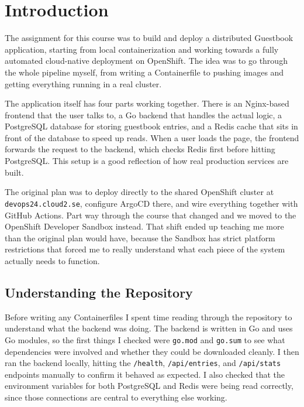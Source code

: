 \section{Introduction}

The assignment for this course was to build and deploy a distributed Guestbook application,
starting from local containerization and working towards a fully automated cloud-native
deployment on OpenShift. The idea was to go through the whole pipeline myself, from writing
a Containerfile to pushing images and getting everything running in a real cluster.

The application itself has four parts working together. There is an Nginx-based frontend
that the user talks to, a Go backend that handles the actual logic, a PostgreSQL database
for storing guestbook entries, and a Redis cache that sits in front of the database to
speed up reads. When a user loads the page, the frontend forwards the request to the
backend, which checks Redis first before hitting PostgreSQL. This setup is a good
reflection of how real production services are built.

The original plan was to deploy directly to the shared OpenShift cluster at
\texttt{devops24.cloud2.se}, configure ArgoCD there, and wire everything together with
GitHub Actions. Part way through the course that changed and we moved to the OpenShift
Developer Sandbox instead. That shift ended up teaching me more than the original plan
would have, because the Sandbox has strict platform restrictions that forced me to really
understand what each piece of the system actually needs to function.

\subsection{Understanding the Repository}

Before writing any Containerfiles I spent time reading through the repository to understand
what the backend was doing. The backend is written in Go and uses Go modules, so the first
things I checked were \texttt{go.mod} and \texttt{go.sum} to see what dependencies were
involved and whether they could be downloaded cleanly. I then ran the backend locally,
hitting the \texttt{/health}, \texttt{/api/entries}, and \texttt{/api/stats} endpoints
manually to confirm it behaved as expected. I also checked that the environment variables
for both PostgreSQL and Redis were being read correctly, since those connections are central
to everything else working.
